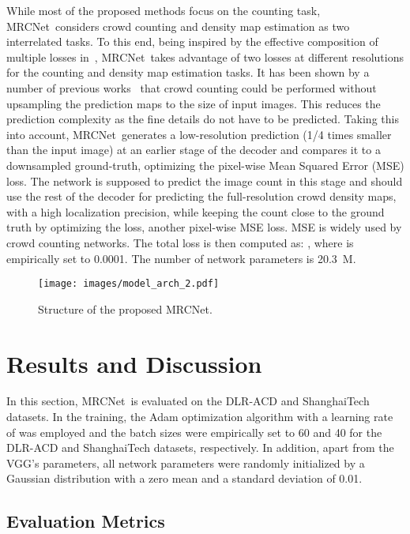 \documentclass{bmvc2k}
\newcommand{\XNET}{MRCNet}
\begin{document}
While most of the proposed methods focus on the counting task, \XNET~considers crowd counting and density map estimation as two interrelated tasks. To this end, being inspired by the effective composition of multiple losses in~\cite{Idrees2018,Ranjan2018,Sindagi2017}, \XNET~takes advantage of two losses at different resolutions for the counting and density map estimation tasks.
It has been shown by a number of previous works~\cite{Zhang2016,Zeng2017,Sam2018,Liu2018b} that crowd counting could be performed without upsampling the prediction maps to the size of input images. This reduces the prediction complexity as the fine details do not have to be predicted. Taking this into account, \XNET~generates a low-resolution prediction (1/4 times smaller than the input image) at an earlier stage of the decoder and compares it to a downsampled ground-truth, optimizing the  pixel-wise Mean Squared Error (MSE) loss. The network is supposed to predict the image count in this stage and should use the rest of the decoder for predicting the full-resolution crowd density maps, with a high localization precision, while keeping the count close to the ground truth by optimizing the  loss, another pixel-wise MSE loss. MSE is widely used by crowd counting networks. The total loss is then computed as: , where  is empirically set to 0.0001. The number of network parameters is 20.3~M.
\begin{figure}
    \centering
    \texttt{[image: images/model\_arch\_2.pdf]}
    \caption{Structure of the proposed \XNET.}
    \label{fig:model}
\end{figure}

\section{Results and Discussion}
In this section, \XNET~is evaluated on the DLR-ACD and ShanghaiTech datasets. In the training, the Adam optimization algorithm with a learning rate of  was employed and the batch sizes were empirically set to 60 and 40 for the DLR-ACD and ShanghaiTech datasets, respectively. In addition, apart from the VGG's parameters, all network parameters were randomly initialized by a Gaussian distribution with a zero mean and a standard deviation of 0.01.

\subsection{Evaluation Metrics}
\end{document}
